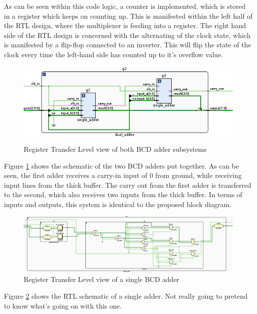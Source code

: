 \documentclass[12pt,a4paper]{article}
\begin{document}
As can be seen within this code logic, a counter is implemented, which is stored in a register which keeps on counting up. This is manifested within the left half of the RTL design, where the multiplexer is feeding into a register. The right hand side of the RTL design is concerned with the alternating of the clock state, which is manifested by a flip-flop connected to an inverter. This will flip the state of the clock every time the left-hand side has counted up to it's overflow value.

\begin{figure}[H]
    \centering
    \includegraphics[scale=0.25]{images/rtl_dual_adder.png}
    \caption{Register Transfer Level view of both BCD adder subsystems}
    \label{fig:rtl_dual_adder}
\end{figure}

Figure \ref{fig:rtl_dual_adder} shows the schematic of the two BCD adders put together. As can be seen, the first adder receives a carry-in input of 0 from ground, while receiving input lines from the thick buffer. The carry out from the first adder is transferred to the second, which also receives two inputs from the thick buffer. In terms of inputs and outputs, this system is identical to the proposed block diagram.

\begin{figure}[H]
    \centering
    \includegraphics[scale=0.25]{images/rtl_single_adder.png}
    \caption{Register Transfer Level view of a single BCD adder}
    \label{fig:rtl_single_adder}
\end{figure}

Figure \ref{fig:rtl_single_adder} shows the RTL schematic of a single adder. Not really going to pretend to know what's going on with this one.
\end{document}
